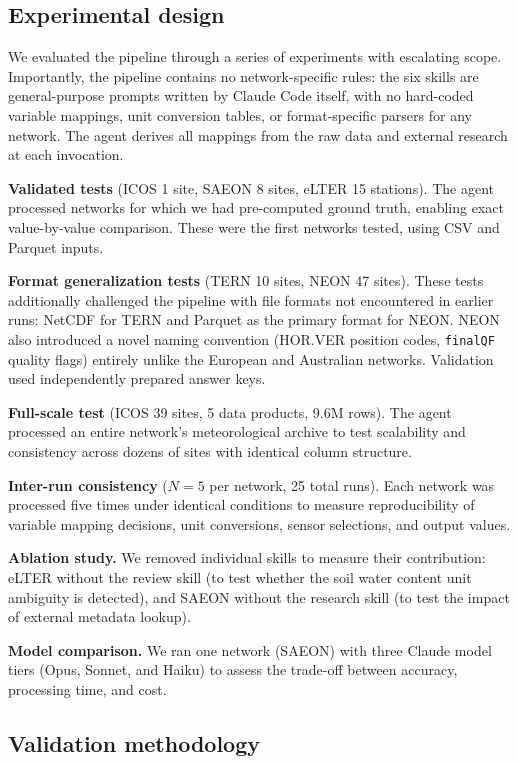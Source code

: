 \documentclass[review,authoryear]{elsarticle}
\begin{document}
\subsection{Experimental design}
\label{sec:experimental-design}

We evaluated the pipeline through a series of experiments with escalating scope. Importantly, the pipeline contains no network-specific rules: the six skills are general-purpose prompts written by Claude Code itself, with no hard-coded variable mappings, unit conversion tables, or format-specific parsers for any network. The agent derives all mappings from the raw data and external research at each invocation.

\textbf{Validated tests} (ICOS 1 site, SAEON 8 sites, eLTER 15 stations). The agent processed networks for which we had pre-computed ground truth, enabling exact value-by-value comparison. These were the first networks tested, using CSV and Parquet inputs.

\textbf{Format generalization tests} (TERN 10 sites, NEON 47 sites). These tests additionally challenged the pipeline with file formats not encountered in earlier runs: NetCDF for TERN and Parquet as the primary format for NEON. NEON also introduced a novel naming convention (HOR.VER position codes, \texttt{finalQF} quality flags) entirely unlike the European and Australian networks. Validation used independently prepared answer keys.

\textbf{Full-scale test} (ICOS 39 sites, 5 data products, 9.6M rows). The agent processed an entire network's meteorological archive to test scalability and consistency across dozens of sites with identical column structure.

\textbf{Inter-run consistency} ($N = 5$ per network, 25 total runs). Each network was processed five times under identical conditions to measure reproducibility of variable mapping decisions, unit conversions, sensor selections, and output values.

\textbf{Ablation study.} We removed individual skills to measure their contribution: eLTER without the review skill (to test whether the soil water content unit ambiguity is detected), and SAEON without the research skill (to test the impact of external metadata lookup).

\textbf{Model comparison.} We ran one network (SAEON) with three Claude model tiers (Opus, Sonnet, and Haiku) to assess the trade-off between accuracy, processing time, and cost.

\subsection{Validation methodology}
\label{sec:validation}
\end{document}
